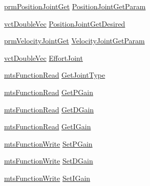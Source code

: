\begin{DoxyCompactItemize}
\item 
\hyperlink{classprm_position_joint_get}{prm\+Position\+Joint\+Get} \hyperlink{structmts_p_i_d_qt_widget_1_1_controller_p_i_d_struct_aaed49b26735d2f1c14203feb4c3e3035}{Position\+Joint\+Get\+Param}
\item 
\hyperlink{vct_dynamic_vector_types_8h_ade4b3068c86fb88f41af2e5187e491c2}{vct\+Double\+Vec} \hyperlink{structmts_p_i_d_qt_widget_1_1_controller_p_i_d_struct_aa1c17a8bd709539648087c15051df449}{Position\+Joint\+Get\+Desired}
\item 
\hyperlink{classprm_velocity_joint_get}{prm\+Velocity\+Joint\+Get} \hyperlink{structmts_p_i_d_qt_widget_1_1_controller_p_i_d_struct_a752b3f63f74d847587a28ecb6d451f4f}{Velocity\+Joint\+Get\+Param}
\item 
\hyperlink{vct_dynamic_vector_types_8h_ade4b3068c86fb88f41af2e5187e491c2}{vct\+Double\+Vec} \hyperlink{structmts_p_i_d_qt_widget_1_1_controller_p_i_d_struct_aeaf828e375da93ba720f086ada488872}{Effort\+Joint}
\item 
\hyperlink{classmts_function_read}{mts\+Function\+Read} \hyperlink{structmts_p_i_d_qt_widget_1_1_controller_p_i_d_struct_abd4222d930a2f14d9ad8c7134e0674cd}{Get\+Joint\+Type}
\item 
\hyperlink{classmts_function_read}{mts\+Function\+Read} \hyperlink{structmts_p_i_d_qt_widget_1_1_controller_p_i_d_struct_a68db81247f8178e5435ccb691bb57ec2}{Get\+P\+Gain}
\item 
\hyperlink{classmts_function_read}{mts\+Function\+Read} \hyperlink{structmts_p_i_d_qt_widget_1_1_controller_p_i_d_struct_a6df0ee7568c23319914fbc0b8cecdbfb}{Get\+D\+Gain}
\item 
\hyperlink{classmts_function_read}{mts\+Function\+Read} \hyperlink{structmts_p_i_d_qt_widget_1_1_controller_p_i_d_struct_aa737b5930269ff3452acb563c1a743f1}{Get\+I\+Gain}
\item 
\hyperlink{classmts_function_write}{mts\+Function\+Write} \hyperlink{structmts_p_i_d_qt_widget_1_1_controller_p_i_d_struct_a14411a7decab1058d1b267b997a2960f}{Set\+P\+Gain}
\item 
\hyperlink{classmts_function_write}{mts\+Function\+Write} \hyperlink{structmts_p_i_d_qt_widget_1_1_controller_p_i_d_struct_a9abb10038fcad81ddfa684b60833ab0f}{Set\+D\+Gain}
\item 
\hyperlink{classmts_function_write}{mts\+Function\+Write} \hyperlink{structmts_p_i_d_qt_widget_1_1_controller_p_i_d_struct_a2b46f76b59bc5f723b4e10b8533a3321}{Set\+I\+Gain}
\end{DoxyCompactItemize}


